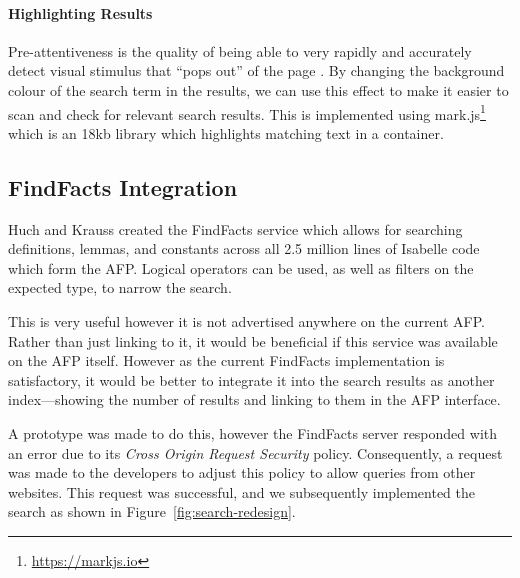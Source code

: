 \documentclass[bsc,frontabs,oneside,singlespacing,parskip,deptreport,logo]{infthesis}
\begin{document}
\paragraph*{Highlighting Results}

Pre-attentiveness is the quality of being able to very rapidly and accurately detect visual stimulus that ``pops out'' of the page \cite{healey2012attention}. By changing the background colour of the search term in the results, we can use this effect to make it easier to scan and check for relevant search results. This is implemented using mark.js\footnote{\url{https://markjs.io}} which is an 18kb library which highlights matching text in a container.

\subsection{FindFacts Integration}
\cbstart
Huch and Krauss created the FindFacts service \cite{HuchKrauss} which allows for searching definitions, lemmas, and constants across all 2.5 million lines of Isabelle code which form the AFP. Logical operators can be used, as well as filters on the expected type, to narrow the search. 

This is very useful however it is not advertised anywhere on the current AFP. Rather than just linking to it, it would be beneficial if this service was available on the AFP itself. However as the current FindFacts implementation is satisfactory, it would be better to integrate it into the search results as another index---showing the number of results and linking to them in the AFP interface. 

A prototype was made to do this, however the FindFacts server responded with an error due to its \emph{Cross Origin Request Security} policy. Consequently, a request was made to the developers to  adjust this policy to allow queries from other websites. This request was successful, and we subsequently implemented the search as shown in Figure~\ref{fig:search-redesign}.
\cbend
\end{document}
